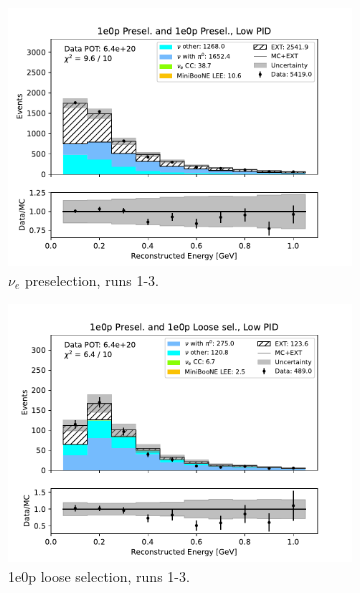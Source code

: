 \begin{figure}[H]
    \centering
    \begin{subfigure}{0.5\linewidth}
        \includegraphics[width=\linewidth]{technote/Sidebands/Figures/FarSideband/far_sideband_reco_e_run123_ZP_ZP_LOW_PID.pdf}
        \caption{$\nu_e$ preselection, runs 1-3.}
    \end{subfigure}%
    \begin{subfigure}{0.5\linewidth}
        \includegraphics[width=\linewidth]{technote/Sidebands/Figures/FarSideband/far_sideband_reco_e_run123_ZP_ZPLOOSESEL_LOW_PID.pdf}
        \caption{1e0p loose selection, runs 1-3.}
    \end{subfigure}
    \begin{subfigure}{0.5\linewidth}

\end{subfigure}
\end{figure}
